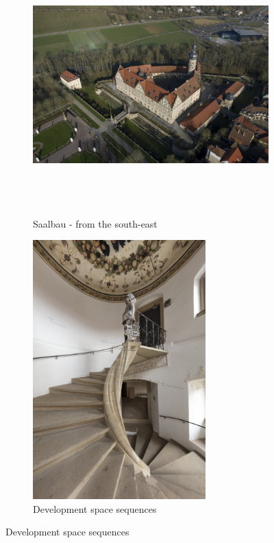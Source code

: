 \documentclass[
  a4paper,
]{book}
\begin{document}
\begin{figure}
\begin{figure}[H]    
  \includegraphics[height=10cm]{images/fmd10024322a.jpg}
  \caption{Saalbau - from the south-east}
  \label{fig:{images/fmd10024322a.jpg}}
\end{figure}

\clearpage

\begin{figure}[H]    
  \includegraphics[height=10cm]{images/fmd10005853a.jpg}
  \caption{Development space sequences}
  \label{fig:{images/fmd10005853a.jpg}}
\end{figure}

\clearpage


\end{figure}
\end{document}
